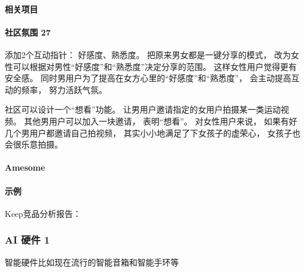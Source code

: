 \documentclass[letterpaper,11pt,english]{sphinxmanual}
\begin{document}
\paragraph{相关项目}
\label{\detokenize{chapter_project/AI_fit:id20}}


\paragraph{社区氛围 27\sphinxfootnotemark[711]}
\label{\detokenize{chapter_project/AI_fit:id21}}%
\begin{footnotetext}[711]\sphinxAtStartFootnote
{}
%
\end{footnotetext}\ignorespaces 
添加2个互动指针： 好感度、熟悉度。 把原来男女都是一键分享的模式，
改为女性可以根据对男性“好感度”和“熟悉度”决定分享的范围。
这样女性用户觉得更有安全感。
同时男用户为了提高在女方心里的“好感度”和“熟悉度”，
会主动提高互动的频率， 努力活跃气氛。

社区可以设计一个“想看”功能。
让男用户邀请指定的女用户拍摄某一类运动视频。
其他男用户可以加入一块邀请， 表明“想看”。 对女性用户来说，
如果有好几个男用户都邀请自己拍视频， 其实小小地满足了下女孩子的虚荣心，
女孩子也会很乐意拍摄。


\paragraph{Amesome}
\label{\detokenize{chapter_project/AI_fit:amesome}}


\paragraph{示例}
\label{\detokenize{chapter_project/AI_fit:id22}}
Keep竞品分析报告：


\subsubsection{AI 硬件 1\sphinxfootnotemark[712]}
\label{\detokenize{chapter_project/AI_hardware:ai-1}}\label{\detokenize{chapter_project/AI_hardware::doc}}%
\begin{footnotetext}[712]\sphinxAtStartFootnote
{}
%
\end{footnotetext}\ignorespaces 
智能硬件比如现在流行的智能音箱和智能手环等
\end{document}
